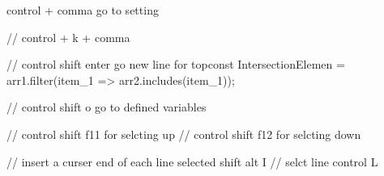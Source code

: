 control + comma go to setting


// control + k + comma

// control shift enter  go new line for topconst IntersectionElemen = arr1.filter(item_1 => arr2.includes(item_1));

// control shift o go to defined variables 

// control shift f11 for selcting up 
// control shift f12 for selcting down 

// insert a curser end of each line selected shift alt I
// selct line control L


